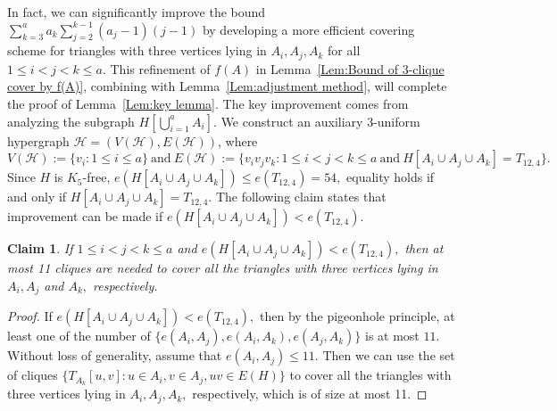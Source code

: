\documentclass[11pt,a4paper]{article}
\newtheorem{clm}[dfn]{Claim}
\newcommand{\turangraph}[2]{T_{#1,#2}}
\begin{document}
In fact, we can significantly improve the bound $\sum_{k=3}^{a} a_k \sum_{j=2}^{k-1} (a_j-1)(j-1)$ by developing a more efficient covering scheme for triangles with three vertices lying in $A_i, A_j,A_k$ for all $1\leq i<j<k\le a$. 
This refinement of $f(A)$ in Lemma~\ref{Lem:Bound of 3-clique cover by f(A)}, combining with Lemma~\ref{Lem:adjustment method}, will complete the proof of Lemma~\ref{Lem:key lemma}.
The key improvement comes from analyzing the subgraph $H[\bigcup_{i=1}^a A_i]$. 
We construct an auxiliary 3-uniform hypergraph $\mathcal{H} = (V(\mathcal{H}), E(\mathcal{H}))$, where
$$ V(\mathcal{H}):=\{ v_i: 1\leq i\leq a\}\ 
\text{and}\ E(\mathcal{H}):= \{ v_iv_jv_k: 1\le i<j<k\le a\ \text{and}\ H[A_i\cup A_j\cup A_k]= \turangraph{12}{4} \}.$$
Since $H$ is $K_5$-free, 
$e(H[A_i\cup A_j\cup A_k])\le e(\turangraph{12}{4})=54,$ 
equality holds if and only if $H[A_i\cup A_j\cup A_k]=\turangraph{12}{4}.$
The following claim states that improvement can be made if $e(H[A_i\cup A_j\cup A_k])<e(\turangraph{12}{4}).$
\begin{clm}\label{Clm:Use less cliques}
	If $1\leq i<j<k\le a$ and
    $e(H[A_i\cup A_j\cup A_k])< e(\turangraph{12}{4}),$
    then at most 11 cliques are needed to cover all the triangles with three vertices lying in $A_i, A_j$ and $A_k,$ respectively.   
\end{clm}
\begin{proof}
If $e(H[A_i\cup A_j\cup A_k])< e(\turangraph{12}{4}),$
then by the pigeonhole principle, at least one of the number of 
$\{e(A_i,A_j),e(A_i,A_k),e(A_j,A_k)\}$ is at most $11.$ 
Without loss of generality, assume that $e(A_i,A_j)\le 11.$ 
Then we can use the set of cliques
$\{T_{A_k}[u,v]: u\in A_i, v\in A_j, uv\in E(H)\}$
to cover all the triangles with three vertices lying in $A_i, A_j, A_k,$ respectively,
which is of size at most 11.
\end{proof}
\end{document}
